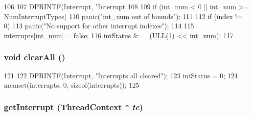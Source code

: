 \begin{DoxyCode}
106     {
107         DPRINTF(Interrupt, "Interrupt %
108 
109         if (int_num < 0 || int_num >= NumInterruptTypes)
110             panic("int_num out of bounds\n");
111 
112         if (index != 0)
113             panic("No support for other interrupt indexes\n");
114 
115         interrupts[int_num] = false;
116         intStatus &= ~(ULL(1) << int_num);
117     }
\end{DoxyCode}
\hypertarget{classArmISA_1_1Interrupts_a798729dca95209ecdc609807a653a2bf}{
\subsubsection[{clearAll}]{\setlength{\rightskip}{0pt plus 5cm}void clearAll ()}}
\label{classArmISA_1_1Interrupts_a798729dca95209ecdc609807a653a2bf}



\begin{DoxyCode}
121     {
122         DPRINTF(Interrupt, "Interrupts all cleared\n");
123         intStatus = 0;
124         memset(interrupts, 0, sizeof(interrupts));
125     }
\end{DoxyCode}
\hypertarget{classArmISA_1_1Interrupts_ae603c88d759977611d3bcc6e2deb61ae}{
\subsubsection[{getInterrupt}]{ getInterrupt ({\bf ThreadContext} $\ast$ {\em tc})}}
\label{classArmISA_1_1Interrupts_ae603c88d759977611d3bcc6e2deb61ae}



